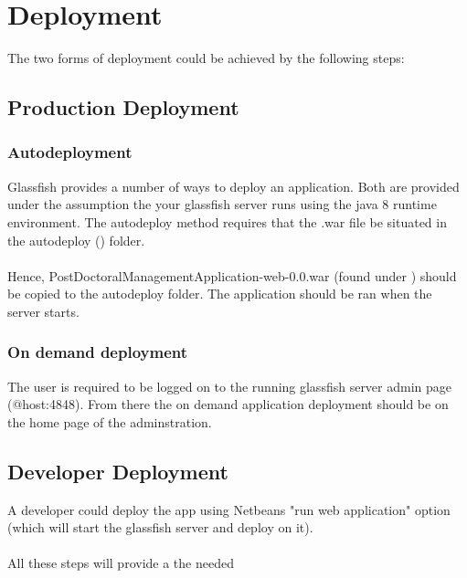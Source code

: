 \documentclass[12pt]{article}
\begin{document}
\section{Deployment}
The two forms of deployment could be achieved by the following steps: 
\subsection{Production Deployment}

\subsubsection{Autodeployment}
Glassfish provides a number of ways to deploy an application. Both are provided under the assumption the your glassfish server runs using the java 8 runtime environment. The autodeploy method requires that the .war file be situated in the autodeploy (\textbf{}) folder.\\ 
\\
Hence, PostDoctoralManagementApplication-web-0.0.war (found under \textbf{}) should be copied to the autodeploy folder. The application should be ran when the server starts.

\subsubsection{On demand deployment}
The user is required to be logged on to the running glassfish server admin page (@host:4848). From there the on demand application deployment should be on the home page of the adminstration.

\subsection{Developer Deployment}
A developer could deploy the app using Netbeans "run web application" option (which will start the glassfish server and deploy on it).\\
\\
All these steps will provide a the needed
\end{document}
